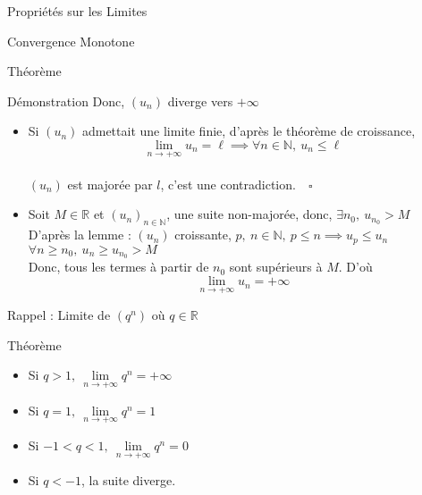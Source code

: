 \documentclass{cours}
\begin{document}
\begin{Gpartie}{Propriétés sur les Limites}
\begin{Spartie}{Convergence Monotone}
\begin{SSpartie}{Théorème}
\begin{SSSpartie}{Démonstration}
                    Donc, $(u_n)$ diverge vers $+\infty$
                    \begin{itemize}
                        \item Si $(u_n)$ admettait une limite finie, d'après le théorème de croissance, 
                        \[\lim\limits_{n\to +\infty}u_n=\ell\implies\forall n\in\mathbb{N},\ u_n\leq\ell\] \\ $(u_n)$ est majorée par $l$, c'est une contradiction.$\quad\square$
                        \\[2ex]
                        \item Soit $M\in\mathbb{R}$ et $(u_n)_{n\in\mathbb{N}}$, une suite non-majorée, donc, $\exists n_0,\ u_{n_0}>M$ \\ D'après la lemme : $(u_n)$ croissante, $p,\ n\in\mathbb{N},\ p\leq n\implies u_p\leq u_n$ \\ $\forall n\geq n_0,\ u_n\geq u_{n_0}>M$ \\ Donc, tous les termes à partir de $n_0$ sont supérieurs à $M$. D'où \[\lim\limits_{n\to +\infty}u_n=+\infty\]
                    \end{itemize}
                \end{SSSpartie}
            \end{SSpartie}
        \end{Spartie}
        \begin{Spartie}{Rappel : Limite de $\left(q^n\right)$ où $q\in\mathbb{R}$} 
            \begin{SSpartie}{Théorème} 
                \begin{itemize}
                    \setlength\itemsep{0.5em}
                    \item Si $q>1,\ \lim\limits_{n\to +\infty}q^n=+\infty$
                    \item Si $q=1,\ \lim\limits_{n\to +\infty}q^n=1$
                    \item Si $-1<q<1,\ \lim\limits_{n\to +\infty}q^n=0$
                    \item Si $q<-1$, la suite diverge.
                \end{itemize}
            \end{SSpartie}
        \end{Spartie}
    \end{Gpartie}
    \pagebreak
\end{document}
